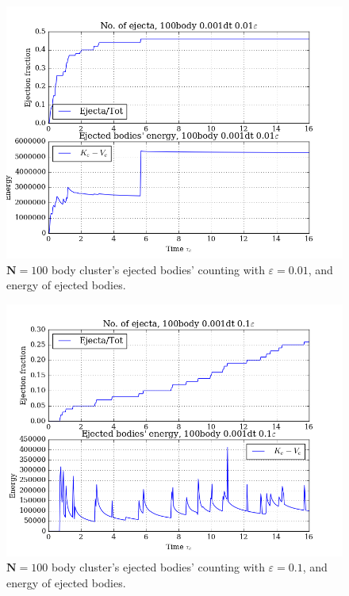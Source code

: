 \documentclass[11pt,a4paper,notitlepage,twocolumn]{article}
\begin{document}
\begin{figure}
[H]\center
\includegraphics[scale=0.35]{../figs/ClusterEnergiesEjecEn_100body_dt1_eps1_dur16.png}
\caption{$\mathbf{N} = 100$ body cluster's ejected bodies' counting with $\varepsilon = 0.01$, and energy of ejected bodies.}\label{fig:N100eps1ejecEn}
\end{figure}
\begin{figure}
[H]\center
\includegraphics[scale=0.35]{../figs/ClusterEnergiesEjecEn_100body_dt1_eps10_dur16.png}
\caption{$\mathbf{N} = 100$ body cluster's ejected bodies' counting with $\varepsilon = 0.1$, and energy of ejected bodies.}\label{fig:N100eps10ejecEn}
\end{figure}
\end{document}
